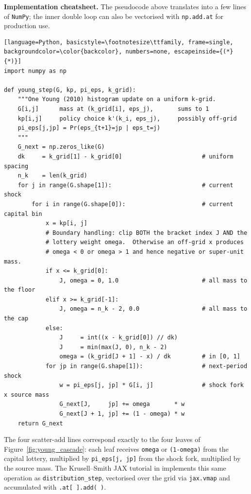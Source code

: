 \documentclass[11pt,a4paper]{report}
\begin{document}
\medskip\noindent\textbf{Implementation cheatsheet.}
The pseudocode above translates into a few lines of \texttt{NumPy}; the inner double loop can also be vectorised with \texttt{np.add.at} for production use.

\begin{lstlisting}[language=Python, basicstyle=\footnotesize\ttfamily, frame=single, backgroundcolor=\color{backcolor}, numbers=none, escapeinside={(*}{*)}]
import numpy as np

def young_step(G, kp, pi_eps, k_grid):
    """One Young (2010) histogram update on a uniform k-grid.
    G[i,j]      mass at (k_grid[i], eps_j),       sums to 1
    kp[i,j]     policy choice k'(k_i, eps_j),     possibly off-grid
    pi_eps[j,jp] = Pr(eps_{t+1}=jp | eps_t=j)
    """
    G_next = np.zeros_like(G)
    dk     = k_grid[1] - k_grid[0]                       # uniform spacing
    n_k    = len(k_grid)
    for j in range(G.shape[1]):                          # current shock
        for i in range(G.shape[0]):                      # current capital bin
            x = kp[i, j]
            # Boundary handling: clip BOTH the bracket index J AND the
            # lottery weight omega.  Otherwise an off-grid x produces
            # omega < 0 or omega > 1 and hence negative or super-unit mass.
            if x <= k_grid[0]:
                J, omega = 0, 1.0                        # all mass to the floor
            elif x >= k_grid[-1]:
                J, omega = n_k - 2, 0.0                  # all mass to the cap
            else:
                J     = int((x - k_grid[0]) // dk)
                J     = min(max(J, 0), n_k - 2)
                omega = (k_grid[J + 1] - x) / dk         # in [0, 1]
            for jp in range(G.shape[1]):                 # next-period shock
                w = pi_eps[j, jp] * G[i, j]              # shock fork x source mass
                G_next[J,     jp] += omega       * w
                G_next[J + 1, jp] += (1 - omega) * w
    return G_next
\end{lstlisting}

The four scatter-add lines correspond exactly to the four leaves of Figure~\ref{fig:young_cascade}: each leaf receives \texttt{omega} or \texttt{(1-omega)} from the capital lottery, multiplied by \texttt{pi\_eps[j, jp]} from the shock fork, multiplied by the source mass.  The Krusell--Smith JAX tutorial in  implements this same operation as \texttt{distribution\_step}, vectorised over the grid via \texttt{jax.vmap} and accumulated with \texttt{.at[\,].add(\,)}.
\end{document}
